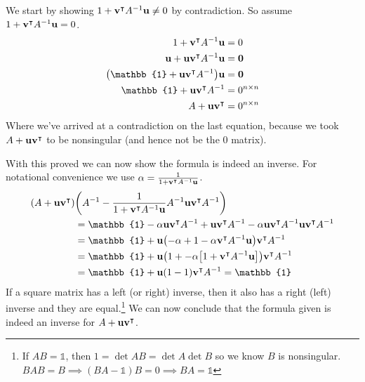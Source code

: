 \documentclass[boxes]{homework}
\newcommand{\tpose}[1]{#1^\intercal}
\newcommand{\inv}[1]{#1^{-1}}
\begin{document}
\begin{solution}
	We start by showing $1 + \tpose{\vb{v}}\inv{A}\vb{u} \neq 0$ by contradiction. So assume $1 + \tpose{\vb{v}}\inv{A}\vb{u} = 0$.
	\begin{align*}
		1 + \tpose{\vb{v}}\inv{A}\vb{u}                      & = 0             \\
		\vb{u} + \vb{u}\tpose{\vb{v}}\inv{A}\vb{u}           & = \vb{0}        \\
		\qty(\mathbb{1} + \vb{u}\tpose{\vb{v}}\inv{A})\vb{u} & = \vb{0}        \\
		\mathbb{1} + \vb{u}\tpose{\vb{v}}\inv{A}             & = 0^{n\times n} \\
		A + \vb{u}\tpose{\vb{v}}                             & = 0^{n\times n}
	\end{align*}
	Where we've arrived at a contradiction on the last equation, because we took $A + \vb{u}\tpose{\vb{v}}$ to be nonsingular (and hence not be the 0 matrix).

	With this proved we can now show the formula is indeed an inverse. For notational convenience we use $\alpha = \frac{1}{1 + \tpose{\vb{v}}\inv{A}\vb{u}}$.
	\begin{align*}
		\qty(A + \vb{u}\tpose{\vb{v}}) & \qty(\inv{A} - \frac{1}{1 + \tpose{\vb{v}}\inv{A}\vb{u}}\inv{A}\vb{u}\tpose{\vb{v}}\inv{A})                                                    \\
		                               & = \mathbb{1} - \alpha\vb{u}\tpose{\vb{v}}\inv{A} + \vb{u}\tpose{\vb{v}}\inv{A} - \alpha \vb{u}\tpose{\vb{v}}\inv{A}\vb{u}\tpose{\vb{v}}\inv{A} \\
		                               & = \mathbb{1} + \vb{u}\qty(-\alpha + 1 - \alpha\tpose{\vb{v}}\inv{A}\vb{u})\tpose{\vb{v}}\inv{A}                                                \\
		                               & = \mathbb{1} + \vb{u}\qty(1 + -\alpha\qty[1 + \tpose{\vb{v}}\inv{A}\vb{u}])\tpose{\vb{v}}\inv{A}                                               \\
		                               & = \mathbb{1} + \vb{u}\qty(1 - 1)\tpose{\vb{v}}\inv{A} = \mathbb{1}
	\end{align*}
	If a square matrix has a left (or right) inverse, then it also has a right (left) inverse and they are equal.\footnote{If $AB = \mathbb{1}$, then $1 = \det AB = \det A\det B$ so we know $B$ is nonsingular. $BAB = B \implies (BA - \mathbb{1})B = 0 \implies BA = \mathbb{1}$} We can now conclude that the formula given is indeed an inverse for $A + \vb{u}\tpose{\vb{v}}$.
\end{solution}
\end{document}
